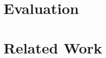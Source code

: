 \documentclass[sigplan,screen]{acmart}
\begin{document}

\section{Evaluation}
\label{sec.eval}

\section{Related Work}
\label{sec.related}
\end{document}
